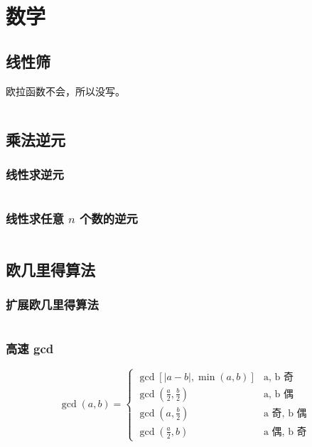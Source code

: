 \section{数学}

\subsection{线性筛}

欧拉函数不会，所以没写。

\inputminted{cpp}{math/prime/prime.cpp}

\subsection{乘法逆元}

\subsubsection{线性求逆元}

\inputminted{cpp}{math/inv/inv.cpp}

\subsubsection{线性求任意 $n$ 个数的逆元}

\inputminted{cpp}{math/inv/inv_any.cpp}

\subsection{欧几里得算法}

\subsubsection{扩展欧几里得算法}

\inputminted[mathescape]{cpp}{math/gcd/ex_eculid.cpp}

\subsubsection{高速 gcd}

\[
\gcd\left(a, b\right) = \begin{cases}
\gcd\left[|a - b|, \min(a, b)\right] & \text{a, b 奇} \\
\gcd\left(\frac{a}{2}, \frac{b}{2}\right) & \text{a, b 偶} \\
\gcd\left(a, \frac{b}{2}\right) & \text{a 奇, b 偶} \\
\gcd\left(\frac{a}{2}, b\right) & \text{a 偶, b 奇} 
\end{cases}
\]

